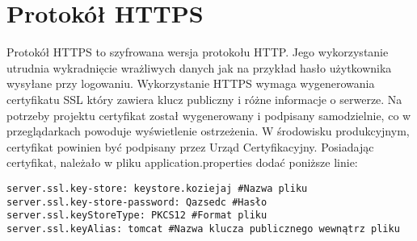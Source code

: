 \documentclass[a4paper,12pt,twoside,openany]{report}
\begin{document}
\section{Protokół HTTPS}
Protokół HTTPS to szyfrowana wersja protokołu HTTP. Jego wykorzystanie utrudnia wykradnięcie wrażliwych danych jak na przykład hasło użytkownika wysyłane przy logowaniu. Wykorzystanie HTTPS wymaga wygenerowania certyfikatu SSL \cite{Owasp} który zawiera klucz publiczny i różne informacje o serwerze. Na potrzeby projektu certyfikat został wygenerowany i podpisany samodzielnie, co w przeglądarkach powoduje wyświetlenie ostrzeżenia. W środowisku produkcyjnym, certyfikat powinien być podpisany przez Urząd Certyfikacyjny. Posiadając certyfikat, należało w pliku application.properties dodać poniższe linie:
\begin{lstlisting}
server.ssl.key-store: keystore.koziejaj #Nazwa pliku
server.ssl.key-store-password: Qazsedc #Hasło
server.ssl.keyStoreType: PKCS12 #Format pliku
server.ssl.keyAlias: tomcat #Nazwa klucza publicznego wewnątrz pliku
\end{lstlisting}
 
\end{document}
